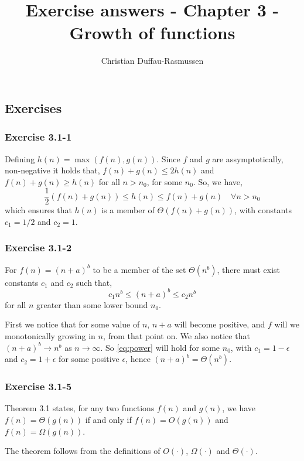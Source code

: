 \documentclass{article}
\title{Exercise answers - Chapter 3 - Growth of functions}
\author{Christian Duffau-Rasmussen}
\begin{document}
\maketitle

\subsection*{Exercises}

\subsubsection*{Exercise 3.1-1}

Defining $h(n) = \max(f(n), g(n))$. Since $f$ and $g$ are assymptotically, non-negative it holds that, $f(n)+ g(n) \leq 2h(n)$ and $f(n) + g(n)\geq h(n)$ for all $n>n_0$, for some $n_0$. So, we have,
\[
\frac{1}{2}(f(n) + g(n)) \leq h(n) \leq f(n) + g(n)\quad\forall n>n_0
\]
which ensures that $h(n)$ is a member of $\Theta(f(n) + g(n))$, with constants $c_1=1/2$ and $c_2=1$. 

\subsubsection*{Exercise 3.1-2}

For $f(n)=(n+a)^b$ to be a member of the set $\Theta(n^b)$, there must exist constants $c_1$ and $c_2$ such that,
\begin{equation} \label{eq:power}
c_1n^b \leq (n+a)^b \leq c_2n^b 
\end{equation} 
for all $n$ greater than some lower bound $n_0$.

First we notice that for some value of $n$, $n+a$ will become positive, and $f$ will we monotonically growing in $n$, from that point on.
We also notice that $(n+a)^b\rightarrow n^b$ as $n\rightarrow\infty$. So \eqref{eq:power} will hold for some $n_0$, with $c_1=1-\epsilon$ and $c_2=1+\epsilon$ for some positive $\epsilon$, hence $(n+a)^b=\Theta(n^b)$.

\subsubsection*{Exercise 3.1-5}

Theorem 3.1 states, for any two functions $f(n)$ and $g(n)$, we have $f(n)= \Theta(g(n))$ if and only if $f(n) = O(g(n))$ and $f(n) = \Omega(g(n))$.

The theorem follows from the definitions of $O(\cdot)$, $\Omega(\cdot)$ and $\Theta(\cdot)$. 
\end{document}
